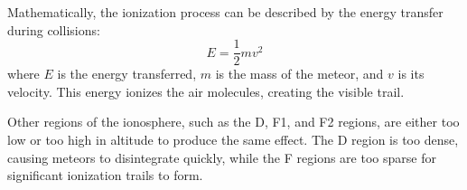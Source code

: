 Mathematically, the ionization process can be described by the energy transfer during collisions:
\[
E = \frac{1}{2} m v^2
\]
where \(E\) is the energy transferred, \(m\) is the mass of the meteor, and \(v\) is its velocity. This energy ionizes the air molecules, creating the visible trail.

Other regions of the ionosphere, such as the D, F1, and F2 regions, are either too low or too high in altitude to produce the same effect. The D region is too dense, causing meteors to disintegrate quickly, while the F regions are too sparse for significant ionization trails to form.


